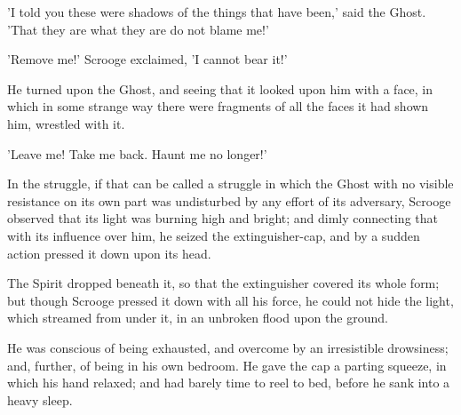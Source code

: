 'I told you these were shadows of the things that have been,' said the
Ghost. 'That they are what they are do not blame me!'

'Remove me!' Scrooge exclaimed, 'I cannot bear it!'

He turned upon the Ghost, and seeing that it looked upon him with a
face, in which in some strange way there were fragments of all the faces
it had shown him, wrestled with it.

'Leave me! Take me back. Haunt me no longer!'

In the struggle, if that can be called a struggle in which the Ghost
with no visible resistance on its own part was undisturbed by any effort
of its adversary, Scrooge observed that its light was burning high and
bright; and dimly connecting that with its influence over him, he seized
the extinguisher-cap, and by a sudden action pressed it down upon its
head.


The Spirit dropped beneath it, so that the extinguisher covered its
whole form; but though Scrooge pressed it down with all his force, he
could not hide the light, which streamed from under it, in an unbroken
flood upon the ground.

He was conscious of being exhausted, and overcome by an irresistible
drowsiness; and, further, of being in his own bedroom. He gave the cap a
parting squeeze, in which his hand relaxed; and had barely time to reel
to bed, before he sank into a heavy sleep.